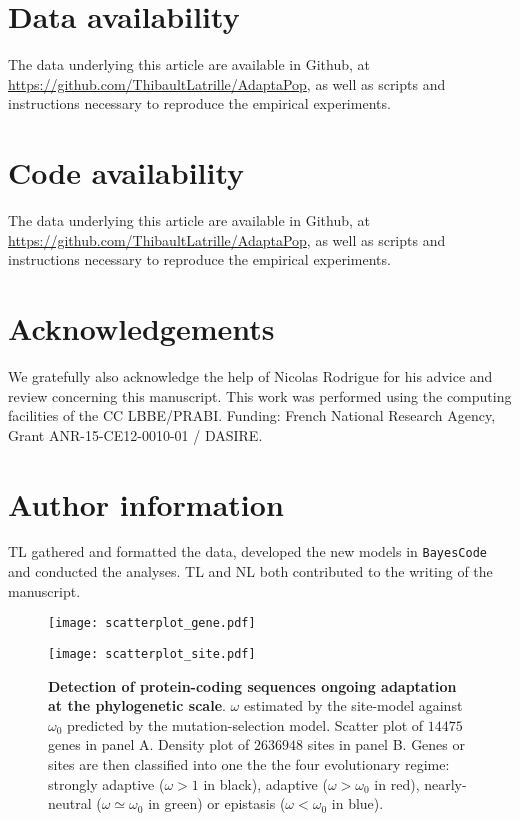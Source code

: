 \documentclass{article}
\begin{document}
\section{Data availability}
The data underlying this article are available in Github, at \url{https://github.com/ThibaultLatrille/AdaptaPop}, as well as scripts and instructions necessary to reproduce the empirical experiments.

\section{Code availability}
The data underlying this article are available in Github, at \url{https://github.com/ThibaultLatrille/AdaptaPop}, as well as scripts and instructions necessary to reproduce the empirical experiments.

\section{Acknowledgements}
We gratefully also acknowledge the help of Nicolas Rodrigue for his advice and review concerning this manuscript.
This work was performed using the computing facilities of the CC LBBE/PRABI.
Funding: French National Research Agency, Grant ANR-15-CE12-0010-01 / DASIRE.

\section{Author information}
TL gathered and formatted the data, developed the new models in \texttt{BayesCode} and conducted the analyses.
TL and NL both contributed to the writing of the manuscript.




\begin{figure*}[h!]
	\centering
	\begin{minipage}{0.49\linewidth}
		\texttt{[image: scatterplot\_gene.pdf]}
	\end{minipage}
	\hfill
	\begin{minipage}{0.49\linewidth}
		\texttt{[image: scatterplot\_site.pdf]}
	\end{minipage}
	\hfill
	\label{fig:scatterplot}
	\caption{ \textbf{Detection of protein-coding sequences ongoing adaptation at the phylogenetic scale}.
		$\omega$ estimated by the site-model against $\omega_{0}$ predicted by the mutation-selection model.
		Scatter plot of $14475$ genes in panel A. Density plot of $2636948$ sites in panel B.
		Genes or sites are then classified into one the the four evolutionary regime: strongly adaptive ($\omega > 1$ in black), adaptive ($\omega > \omega_{0}$ in red), nearly-neutral ($\omega \simeq \omega_{0}$ in green) or epistasis ($\omega < \omega_{0}$ in blue). }
\end{figure*}
\end{document}
